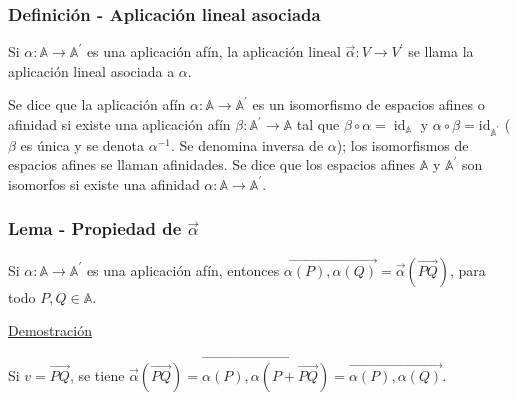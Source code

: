 \documentclass[12pt, a4paper, ones, notitlepage, openany,titlepage]{article}
\newcommand{\demostracion}{\noindent\underline{Demostración}}
\begin{document}
\subsubsection{Definición - Aplicación lineal asociada} Si $\alpha: \mathbb{A} \rightarrow \mathbb{A}^{\prime}$ es una aplicación afín, la aplicación lineal $\vec{\alpha}: V \rightarrow V^{\prime}$ se llama la aplicación lineal asociada a $\alpha$.

Se dice que la aplicación afín $\alpha: \mathbb{A} \rightarrow \mathbb{A}^{\prime}$ es un isomorfismo de espacios afines o afinidad si existe una aplicación afín $\beta: \mathbb{A}^{\prime} \rightarrow \mathbb{A}$ tal que $\beta \circ \alpha=\operatorname{id}_{\mathbb{A}}$ y $\alpha \circ \beta=\mathrm{id}_{\mathbb{A}^{\prime}}$ ($\beta$ es única y se denota $\alpha^{-1}$. Se denomina inversa de $\alpha$); los isomorfismos de espacios afines se llaman afinidades. Se dice que los espacios afines $\mathbb{A}$ y $\mathbb{A}^{\prime}$ son isomorfos si existe una afinidad $\alpha: \mathbb{A} \rightarrow \mathbb{A}^{\prime}$.\\

\subsubsection{Lema - Propiedad de $\overrightarrow{\alpha}$}
\noindent Si $\alpha: \mathbb{A} \rightarrow \mathbb{A}^{\prime}$ es una aplicación afín, entonces $\overrightarrow{\alpha(P), \alpha(Q)}=\vec{\alpha}(\overrightarrow{P Q})$, para todo $P, Q \in \mathbb{A}$.

\demostracion

\noindent Si $v=\overrightarrow{P Q}$, se tiene $\vec{\alpha}(\overrightarrow{P Q})=\overrightarrow{\alpha(P), \alpha(P+\overrightarrow{P Q})}=\overrightarrow{\alpha(P), \alpha(Q)}$.\\
\end{document}
